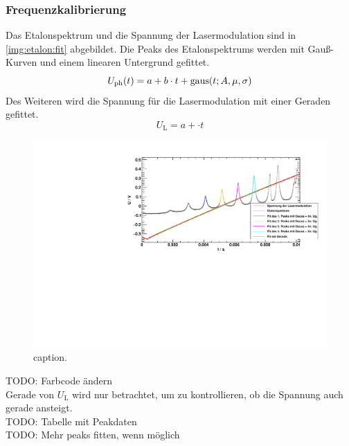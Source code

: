 \subsubsection*{Frequenzkalibrierung}
Das Etalonspektrum und die Spannung der Lasermodulation sind in \autoref{img:etalon:fit} abgebildet. 
Die Peaks des Etalonspektrums werden mit Gauß-Kurven und einem linearen Untergrund gefittet. 
\begin{equation}
    U_\text{ph}(t) = a + b \cdot t + \operatorname{gaus}(t; A, \mu, \sigma)
\end{equation}
Des Weiteren wird die Spannung für die Lasermodulation mit einer Geraden gefittet.
\begin{equation}
    U_\text{L} = a + \cdot t
\end{equation}
\begin{figure}[H]
\begin{center}
  \includegraphics[width=\textwidth]{../img/part2/up-etalon_zoom_fit.pdf}
  \caption{caption.}
  \label{img:etalon:fit}
\end{center}
\end{figure}
TODO: Farbcode ändern \\
Gerade von $U_\text{L}$ wird nur betrachtet, um zu kontrollieren, ob die Spannung auch gerade ansteigt. \\
TODO: Tabelle mit Peakdaten \\
TODO: Mehr peaks fitten, wenn möglich

